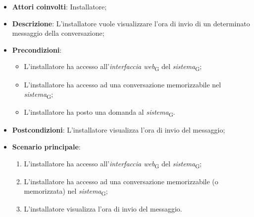 \begin{itemize}
    \item \textbf{Attori coinvolti}: Installatore;
    \item \textbf{Descrizione}: L'installatore vuole visualizzare l'ora di invio di un determinato messaggio della conversazione;
    \item \textbf{Precondizioni}:  
    \begin{itemize}
        \item L’installatore ha accesso all’\textit{interfaccia web}\textsubscript{G} del \textit{sistema}\textsubscript{G};
        \item L’installatore ha accesso ad una conversazione memorizzabile nel \textit{sistema}\textsubscript{G};
        \item L'installatore ha posto una domanda al \textit{sistema}\textsubscript{G}.
    \end{itemize}
    \item \textbf{Postcondizioni}: L'installatore visualizza l'ora di invio del messaggio;
    \item \textbf{Scenario principale}:
    \begin{enumerate}
        \item L’installatore ha accesso all’\textit{interfaccia web}\textsubscript{G} del \textit{sistema}\textsubscript{G};
        \item L’installatore ha accesso ad una conversazione memorizzabile (o memorizzata) nel \textit{sistema}\textsubscript{G};
        \item L'installatore visualizza l'ora di invio del messaggio.
    \end{enumerate}
\end{itemize}

